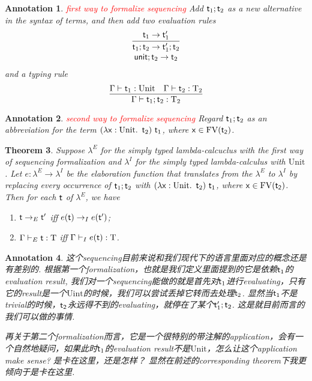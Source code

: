 \documentclass{article}
\theoremstyle{plain}
\newtheorem{theorem}{Theorem}
\newtheorem{annotation}[theorem]{Annotation}
\theoremstyle{nonumberplain}
\newcommand*{\xfunc}[4]{{#2}\colon{#3}{#1}{#4}}
\newcommand*{\func}[3]{\xfunc{\to}{#1}{#2}{#3}}
\newcommand{\lam}[2]{\ensuremath{\lambda #1\ldotp~ #2}} %
\newcommand{\singletype}[1]{\text{#1}}
\newcommand{\termtype}[2]{\ensuremath{#1:#2}}
\newcommand{\term}[1]{\ensuremath\mathsf{#1}}
\newcommand{\seq}[2]{#1;#2}
\newcommand{\redt}[1]{\textcolor{red}{#1}}
\begin{document}
\begin{annotation}
\rm \redt{ first way to formalize sequencing} Add $\seq{\term{t}_1}{\term{t}_2}$ as a new alternative in the syntax of terms, and then add two evaluation rules
$$
\begin{array}{cc}
\infer{\seq{\term{t}_1}{\term{t}_2} \to \seq{\term{t}_1'}{\term{t}_2}}{\term{t}_1 \to \term{t}_1'} \\
\seq{\term{unit}}{\term{t}_2} \to \term{t}_2 
\end{array}
$$
and a typing rule
$$
\infer{\Gamma \vdash \termtype{\seq{\term{t}_1}{\term{t}_2}}{\singletype{T}_2}}{\Gamma \vdash \termtype{\term{t}_1}{\singletype{Unit}} & \Gamma \vdash \termtype{\term{t}_2}{\singletype{T}_2}}
$$
\end{annotation}

\begin{annotation}
\rm \redt{ second way to formalize sequencing} Regard $\seq{\term{t}_1}{\term{t}_2}$ as an abbreviation for the term $(\lam{\termtype{\term{x}}{\singletype{Unit}}}{\term{t}_2})~\term{t}_1$, where $\term{x} \in \text{FV}(\term{t_2})$. 
\end{annotation}

\begin{theorem}
\rm Suppose $\lambda^E$ for the simply typed lambda-calcuclus with the first way of sequencing formalization and $\lambda^I$ for the simply typed lambda-calculus with $\singletype{Unit}$. Let $\func{e}{\lambda^E}{\lambda^I}$ be the elaboration function that translates from the $\lambda^E$ to $\lambda^I$ by replacing every occurrence of $\seq{\term{t}_1}{\term{t}_2}$ with $(\lam{\termtype{\term{x}}{\singletype{Unit}}}{\term{t}_2})~\term{t}_1$, where $\term{x} \in \text{FV}(\term{t_2})$. Then for each $\term{t}$ of $\lambda^E$, we have 
\begin{enumerate}
	\item $\term{t} \to_E \term{t}'$ iff $e(\term{t}) \to _I e(\term{t}')$;
	\item $\Gamma \vdash_E \termtype{\term{t}}{\singletype{T}}$ iff $\Gamma \vdash_I \termtype{e(\term{t})}{\singletype{T}}$. 
\end{enumerate} 
\end{theorem}

\begin{annotation}
\rm 这个sequencing目前来说和我们现代下的语言里面对应的概念还是有差别的. 根据第一个formalization，也就是我们定义里面提到的它是依赖$\term{t}_1$的evaluation result, 我们对一个sequencing能做的就是首先对$\term{t}_1$进行evaluating，只有它的result是一个$\singletype{Uint}$的时候，我们可以尝试丢掉它转而去处理$\term{t}_2$.  显然当$\term{t}_1$不是trivial的时候，$\term{t_2}$永远得不到的evaluating，就停在了某个$\seq{\term{t}_1'}{\term{t}_2}$. 这是就目前而言的我们可以做的事情. 

再关于第二个formalization而言，它是一个很特别的带注解的application，会有一个自然地疑问，如果此时$\term{t}_1$的evaluation result不是$\singletype{Unit}$，怎么让这个application make sense? 是卡在这里，还是怎样？ 显然在前述的corresponding theorem下我更倾向于是卡在这里.
\end{annotation}
\end{document}
